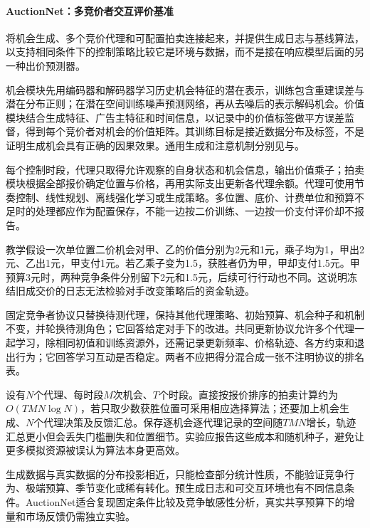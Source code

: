 \paragraph{AuctionNet：多竞价者交互评价基准}
\label{sec:rs-advertising-auctionnet}

将机会生成、多个竞价代理和可配置拍卖连接起来，并提供生成日志与基线算法，以支持相同条件下的控制策略比较它是环境与数据，而不是接在响应模型后面的另一种出价预测器。

机会模块先用编码器和解码器学习历史机会特征的潜在表示，训练包含重建误差与潜在分布正则；在潜在空间训练噪声预测网络，再从去噪后的表示解码机会。价值模块结合生成特征、广告主特征和时间信息，以记录中的价值标签做平方误差监督，得到每个竞价者对机会的价值矩阵。其训练目标是接近数据分布及标签，不是证明生成机会具有正确的因果效果。通用生成和注意机制分别见与。

每个控制时段，代理只取得允许观察的自身状态和机会信息，输出价值乘子；拍卖模块根据全部报价确定位置与价格，再用实际支出更新各代理余额。代理可使用节奏控制、线性规划、离线强化学习或生成策略。多位置、底价、计费单位和预算不足时的处理都应作为配置保存，不能一边按二价训练、一边按一价支付评价却不报告。

教学假设一次单位置二价机会对甲、乙的价值分别为2元和1元，乘子均为1，甲出2元、乙出1元，甲支付1元。若乙乘子变为1.5，获胜者仍为甲，甲却支付1.5元。甲预算3元时，两种竞争条件分别留下2元和1.5元，后续可行行动也不同。这说明冻结旧成交价的日志无法检验对手改变策略后的资金轨迹。

固定竞争者协议只替换待测代理，保持其他代理策略、初始预算、机会种子和机制不变，并轮换待测角色；它回答给定对手下的改进。共同更新协议允许多个代理一起学习，除相同初值和训练资源外，还需记录更新频率、价格轨迹、各方约束和退出行为；它回答学习互动是否稳定。两者不应把得分混合成一张不注明协议的排名表。

设有$N$个代理、每时段$M$次机会、$T$个时段。直接按报价排序的拍卖计算约为$O(TMN\log N)$，若只取少数获胜位置可采用相应选择算法；还要加上机会生成、$N$个代理决策及反馈汇总。保存逐机会逐代理记录的空间随$TMN$增长，轨迹汇总更小但会丢失门槛删失和位置细节。实验应报告这些成本和随机种子，避免让更多模拟资源被误认为算法本身更高效。

生成数据与真实数据的分布投影相近，只能检查部分统计性质，不能验证竞争行为、极端预算、季节变化或稀有转化。预生成日志和可交互环境也有不同信息条件。AuctionNet适合复现固定条件比较及竞争敏感性分析，真实共享预算下的增量和市场反馈仍需独立实验。


